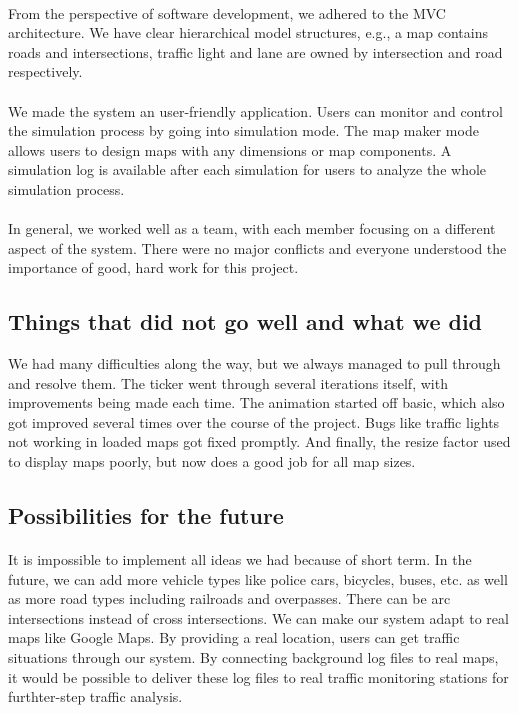 \documentclass[a4paper,11pt,titlepage]{article}
\begin{document}
\paragraph{}
From the perspective of software development, we adhered to the MVC architecture. We have clear hierarchical model structures, e.g., a map contains roads and intersections, traffic light and lane are owned by intersection and road respectively.
\paragraph{}
We made the system an user-friendly application. Users can monitor and control the simulation process by going into simulation mode. The map maker mode allows users to design maps with any dimensions or map components. A simulation log is available after each simulation for users to analyze the whole simulation process. 
\paragraph{}
In general, we worked well as a team, with each member focusing on a different aspect of the system. There were no major conflicts and everyone understood the importance of good, hard work for this project.

\subsection{Things that did not go well and what we did}
We had many difficulties along the way, but we always managed to pull through and resolve them. The ticker went through several iterations itself, with improvements being made each time. The animation started off basic, which also got improved several times over the course of the project. Bugs like traffic lights not working in loaded maps got fixed promptly. And finally, the resize factor used to display maps poorly, but now does a good job for all map sizes.

\subsection{Possibilities for the future}
\paragraph{}
It is impossible to implement all ideas we had because of short term. In the future, we can add more vehicle types like police cars, bicycles, buses, etc. as well as more road types including railroads and overpasses. There can be arc intersections instead of cross intersections. We can make our system adapt to real maps like Google Maps. By providing a real location, users can get traffic situations through our system. By connecting background log files to real maps, it would be possible to deliver these log files to real traffic monitoring stations for furthter-step traffic analysis.
\end{document}
